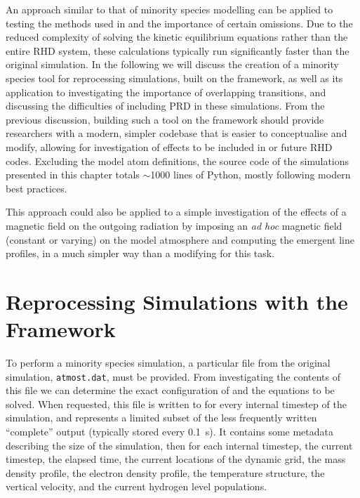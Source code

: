An approach similar to that of minority species modelling can be applied to testing the methods used in \Radyn{} and the importance of certain omissions.
Due to the reduced complexity of solving the kinetic equilibrium equations rather than the entire RHD system, these calculations typically run significantly faster than the original simulation.
In the following we will discuss the creation of a minority species tool for reprocessing \Radyn{} simulations, built on the \Lw{} framework, as well as its application to investigating the importance of overlapping transitions, and discussing the difficulties of including PRD in these simulations.
From the previous discussion, building such a tool on the \Lw{} framework should provide researchers with a modern, simpler codebase that is easier to conceptualise and modify, allowing for investigation of effects to be included in \Radyn{} or future RHD codes.
Excluding the model atom definitions, the source code of the simulations presented in this chapter totals $\sim$1000 lines of Python, mostly following modern best practices.

This approach could also be applied to a simple investigation of the effects of a magnetic field on the outgoing radiation by imposing an \emph{ad hoc} magnetic field (constant or varying) on the model atmosphere and computing the emergent line profiles, in a much simpler way than a modifying \Radyn{} for this task.

\section{Reprocessing \Radyn{} Simulations with the \Lw{} Framework}

To perform a minority species simulation, a particular file from the original simulation, \texttt{atmost.dat}, must be provided.
From investigating the contents of this file we can determine the exact configuration of \Lw{} and the equations to be solved.
When requested, this file is written to for every internal timestep of the \Radyn{} simulation, and represents a limited subset of the less frequently written ``complete'' output (typically stored every \SI{0.1}{\second}).
It contains some metadata describing the size of the simulation, then for each internal timestep, the current timestep, the elapsed time, the current locations of the dynamic grid, the mass density profile, the electron density profile, the temperature structure, the vertical velocity, and the current hydrogen level populations.

